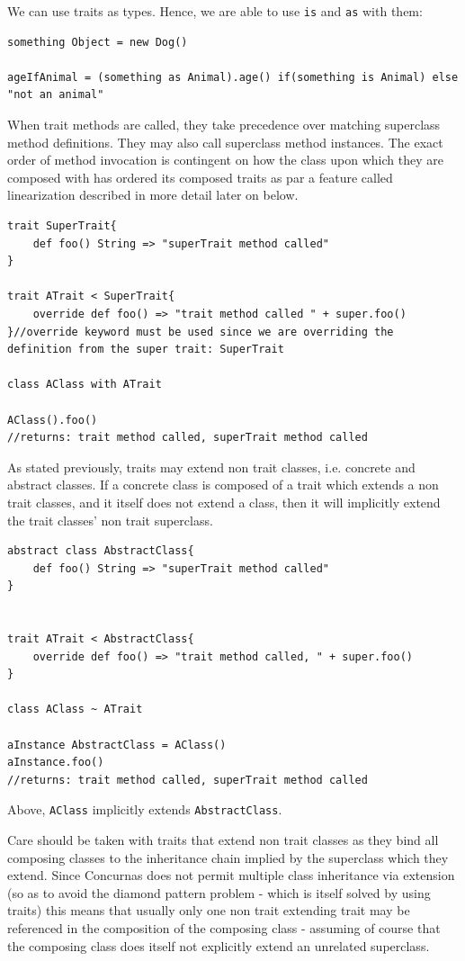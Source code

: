 \documentclass[conc-doc]{subfiles}
\begin{document}
We can use traits as types. Hence, we are able to use \lstinline{is} and \lstinline{as} with them:
\begin{lstlisting}
something Object = new Dog()

ageIfAnimal = (something as Animal).age() if(something is Animal) else "not an animal"
\end{lstlisting}

When trait methods are called, they take precedence over matching superclass method definitions. They may also call superclass method instances. The exact order of method invocation is contingent on how the class upon which they are composed with has ordered its composed traits as par a feature called linearization described in more detail later on below.

\begin{lstlisting}
trait SuperTrait{
	def foo() String => "superTrait method called"
}

trait ATrait < SuperTrait{
	override def foo() => "trait method called " + super.foo()
}//override keyword must be used since we are overriding the definition from the super trait: SuperTrait

class AClass with ATrait

AClass().foo()
//returns: trait method called, superTrait method called
\end{lstlisting}

As stated previously, traits may extend non trait classes, i.e. concrete and abstract classes. If a concrete class is composed of a trait which extends a non trait classes, and it itself does not extend a class, then it will implicitly extend the trait classes' non trait superclass.

\begin{lstlisting}
abstract class AbstractClass{
	def foo() String => "superTrait method called"
}


trait ATrait < AbstractClass{
	override def foo() => "trait method called, " + super.foo()
}

class AClass ~ ATrait 

aInstance AbstractClass = AClass() 
aInstance.foo()
//returns: trait method called, superTrait method called
\end{lstlisting}

Above, \lstinline{AClass} implicitly extends \lstinline{AbstractClass}. 

Care should be taken with traits that extend non trait classes as they bind all composing classes to the inheritance chain implied by the superclass which they extend. Since Concurnas does not permit multiple class inheritance via extension (so as to avoid the diamond pattern problem - which is itself solved by using traits) this means that usually only one non trait extending trait may be referenced in the composition of the composing class - assuming of course that the composing class does itself not explicitly extend an unrelated superclass.
\end{document}
